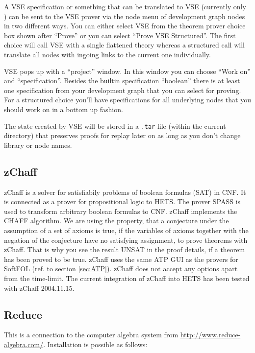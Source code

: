 \documentclass{article}
\newcommand{\normalTEXTSC}[2]{{#1\scriptsize#2}}
\newcommand     {\Hets}{\normalTEXTSC{H}{ETS}\xspace}
\newcommand     {\SPASS}{\normalTEXTSC{S}{PASS}\xspace}
\begin{document}
A VSE specification or something that can be translated to VSE (currently only
\CASL) can be sent to the VSE prover via the node menu of development graph
nodes in two different ways. You can either select VSE from the theorem prover
choice box shown after ``Prove'' or you can select ``Prove VSE Structured''.
The first choice will call VSE with a single flattened theory whereas a
structured call will translate all nodes with ingoing links to the current one
individually.

VSE pops up with a ``project'' window. In this window you can choose ``Work
on'' and ``specification''. Besides the builtin specification ``boolean''
there is at least one specification from your development graph that you
can select for proving. For a structured choice you'll have specifications
for all underlying nodes that you should work on in a bottom up fashion.

The state created by VSE will be stored in a \texttt{.tar} file (within the
current directory) that preserves proofs for replay later on as long as you
don't change library or node names.

\subsection{zChaff}

zChaff is a solver for satisfiabily problems of boolean formulas
(\normalTEXTSC{S}{AT})
in CNF. It is connected as a prover for propositional logic to \Hets. The prover
\SPASS is used to transform arbitrary boolean formulas to CNF. zChaff
implements the \normalTEXTSC{C}{HAFF}\xspace algorithm. We are
using the property, that a conjecture under the assumption of a set of axioms is
true, if the variables of axioms together with the negation of the conjecture
have no satisfying assignment, to prove theorems with zChaff. That is why you see
the result \normalTEXTSC{U}{NSAT}\xspace in the proof details, if a theorem has been proved
to be true. zChaff uses the same ATP GUI as the provers for SoftFOL (ref. to section
\ref{sec:ATP}). zChaff does not accept any options apart from the time-limit. The
current integration of zChaff into \Hets has been tested with zChaff 2004.11.15.

\subsection{Reduce}
This is a connection to the computer algebra system from
\url{http://www.reduce-algebra.com/}. Installation is possible as follows:
\end{document}
